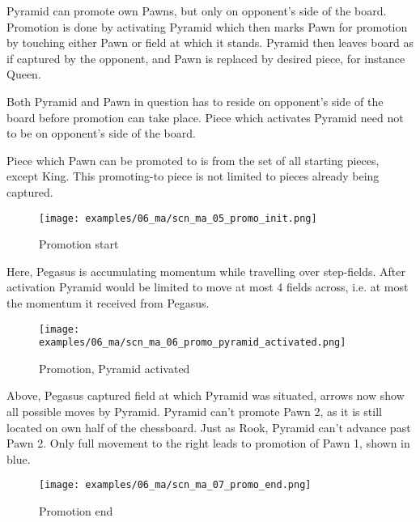 Pyramid can promote own Pawns, but only on opponent's side of the board.
Promotion is done by activating Pyramid which then marks Pawn for promotion
by touching either Pawn or field at which it stands. Pyramid then leaves
board as if captured by the opponent, and Pawn is replaced by desired piece,
for instance Queen.

Both Pyramid and Pawn in question has to reside on opponent's side of the
board before promotion can take place. Piece which activates Pyramid need
not to be on opponent's side of the board.

Piece which Pawn can be promoted to is from the set of all starting pieces,
except King. This promoting-to piece is not limited to pieces already being
captured.

\clearpage %

\noindent
\begin{figure}[!h]
\texttt{[image: examples/06\_ma/scn\_ma\_05\_promo\_init.png]}
\caption{Promotion start}
\label{fig:scn_ma_05_promo_init}
\end{figure}

Here, Pegasus is accumulating momentum while travelling over step-fields. After
activation Pyramid would be limited to move at most 4 fields across, i.e. at most
the momentum it received from Pegasus.

\clearpage %

\noindent
\begin{figure}[!h]
\texttt{[image: examples/06\_ma/scn\_ma\_06\_promo\_pyramid\_activated.png]}
\caption{Promotion, Pyramid activated}
\label{fig:scn_ma_06_promo_pyramid_activated}
\end{figure}

Above, Pegasus captured field at which Pyramid was situated, arrows now show
all possible moves by Pyramid. Pyramid can't promote Pawn 2, as it is still
located on own half of the chessboard. Just as Rook, Pyramid can't advance
past Pawn 2. Only full movement to the right leads to promotion of Pawn 1,
shown in blue.

\clearpage %

\noindent
\begin{figure}[!h]
\texttt{[image: examples/06\_ma/scn\_ma\_07\_promo\_end.png]}
\caption{Promotion end}
\label{fig:scn_ma_07_promo_end}
\end{figure}

